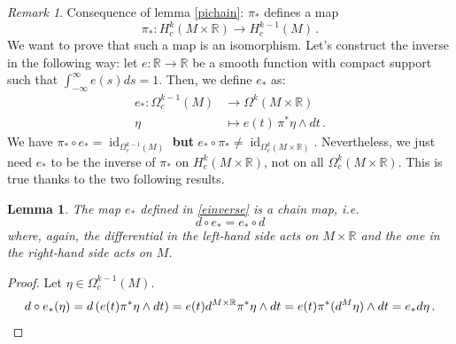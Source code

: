 \documentclass[a4paper,11pt,titlepage, article, oneside]{memoir}
\numberwithin{equation}{section}
\newtheorem{lemma}[theorem]{Lemma}
\theoremstyle{definition}
\theoremstyle{remark}
\newtheorem{remark}[theorem]{Remark}
\DeclareMathOperator{\id}{id}
\newcommand{\rfield}{\mathbb{R}}
\begin{document}
\begin{remarkbox}
\begin{remark}
Consequence of lemma \ref{pichain}: $\pi_*$ defines a map
\[ \pi_* \colon H_c^k(M \times \rfield) \rightarrow H^{k-1}_c(M) \, . \]
We want to prove that such a map is an isomorphism. Let's construct the inverse in the following way: let $e \colon \rfield \rightarrow \rfield$ be a smooth function with compact support  such that $\int_{-\infty}^{\infty} e(s) ds = 1$. Then, we define $e_*$ as:
\begin{align} \label{einverse}
e_* \colon \Omega^{k-1}_c (M) &\rightarrow \Omega^k(M \times \rfield) \\
\eta &\mapsto e(t) \, \pi^*\eta \wedge dt \, . \nonumber
\end{align}
We have $\pi_* \circ e_* = \id_{\Omega_c^{k-1}(M)}$ \textbf{but} $e_* \circ \pi_* \not = \id_{\Omega_c^k(M \times \rfield)}$. Nevertheless, we just need $e_*$ to be the inverse of $\pi_*$ on $H_c^k(M \times \rfield)$, not on all $\Omega^k_c(M \times \rfield)$. This is true thanks to the two following results.
\end{remark}
\end{remarkbox}

\begin{lemma}
The map $e_*$ defined in \eqref{einverse} is a chain map, i.e.
\begin{equation}
d \circ e_* = e_* \circ d
\end{equation}
where, again, the differential in the left-hand side acts on $M \times \rfield$ and the one in the right-hand side acts on $M$.
\end{lemma}
\begin{proof}
Let $\eta \in \Omega^{k-1}_c(M)$.
\begin{equation*}
d \circ e_*(\eta) = d \left ( e(t)  \pi^*\eta \wedge dt \right ) = e(t) d^{M \times \rfield} \pi^*\eta \wedge dt = e(t) \pi^*(d^M \eta) \wedge dt = e_* d \eta \, . \qedhere
\end{equation*}
\end{proof}
\end{document}

